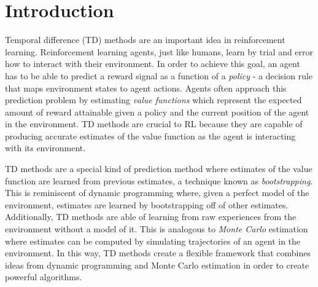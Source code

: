\providecommand{\main}{..}


\chapter{Introduction}
\label{ch1:introduction}



Temporal difference (TD) methods are an important idea in reinforcement learning. 
Reinforcement learning agents, just like humans, learn by trial and error how to interact with their environment.
In order to achieve this goal, an agent has to be able to predict a reward signal as a function of a \textit{policy} - a decision rule that maps environment states to agent actions.
Agents often approach this prediction problem by estimating \textit{value functions} which represent the expected amount of reward attainable given a policy and the current position of the agent in the environment.
TD methods are crucial to RL because they are capable of producing accurate estimates of the value function as the agent is interacting with its environment.

TD methods are a special kind of prediction method where estimates of the value function are learned from previous estimates, a technique known as \textit{bootstrapping}.
This is reminiscent of dynamic programming where, given a perfect model of the environment, estimates are learned by bootstrapping off of other estimates.
Additionally, TD methods are able of learning from raw experiences from the environment without a model of it.
This is analogous to \textit{Monte Carlo} estimation where estimates can be computed by simulating trajectories of an agent in the environment.
In this way, TD methods create a flexible framework that combines ideas from dynamic programming and Monte Carlo estimation in order to create powerful algorithms.

